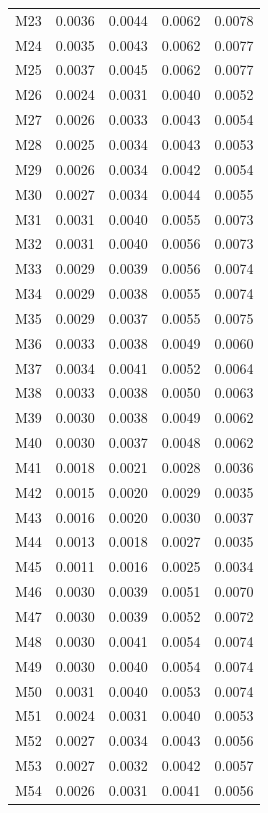 \begin{longtable}{lrrrr}
M23 & 0.0036 & 0.0044 & 0.0062 & 0.0078 \\
M24 & 0.0035 & 0.0043 & 0.0062 & 0.0077 \\
M25 & 0.0037 & 0.0045 & 0.0062 & 0.0077 \\
M26 & 0.0024 & 0.0031 & 0.0040 & 0.0052 \\
M27 & 0.0026 & 0.0033 & 0.0043 & 0.0054 \\
M28 & 0.0025 & 0.0034 & 0.0043 & 0.0053 \\
M29 & 0.0026 & 0.0034 & 0.0042 & 0.0054 \\
M30 & 0.0027 & 0.0034 & 0.0044 & 0.0055 \\
M31 & 0.0031 & 0.0040 & 0.0055 & 0.0073 \\
M32 & 0.0031 & 0.0040 & 0.0056 & 0.0073 \\
M33 & 0.0029 & 0.0039 & 0.0056 & 0.0074 \\
M34 & 0.0029 & 0.0038 & 0.0055 & 0.0074 \\
M35 & 0.0029 & 0.0037 & 0.0055 & 0.0075 \\
M36 & 0.0033 & 0.0038 & 0.0049 & 0.0060 \\
M37 & 0.0034 & 0.0041 & 0.0052 & 0.0064 \\
M38 & 0.0033 & 0.0038 & 0.0050 & 0.0063 \\
M39 & 0.0030 & 0.0038 & 0.0049 & 0.0062 \\
M40 & 0.0030 & 0.0037 & 0.0048 & 0.0062 \\
M41 & 0.0018 & 0.0021 & 0.0028 & 0.0036 \\
M42 & 0.0015 & 0.0020 & 0.0029 & 0.0035 \\
M43 & 0.0016 & 0.0020 & 0.0030 & 0.0037 \\
M44 & 0.0013 & 0.0018 & 0.0027 & 0.0035 \\
M45 & 0.0011 & 0.0016 & 0.0025 & 0.0034 \\
M46 & 0.0030 & 0.0039 & 0.0051 & 0.0070 \\
M47 & 0.0030 & 0.0039 & 0.0052 & 0.0072 \\
M48 & 0.0030 & 0.0041 & 0.0054 & 0.0074 \\
M49 & 0.0030 & 0.0040 & 0.0054 & 0.0074 \\
M50 & 0.0031 & 0.0040 & 0.0053 & 0.0074 \\
M51 & 0.0024 & 0.0031 & 0.0040 & 0.0053 \\
M52 & 0.0027 & 0.0034 & 0.0043 & 0.0056 \\
M53 & 0.0027 & 0.0032 & 0.0042 & 0.0057 \\
M54 & 0.0026 & 0.0031 & 0.0041 & 0.0056 \\

\end{longtable}
